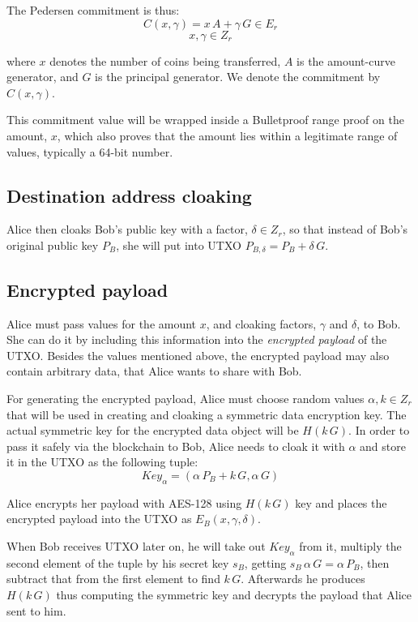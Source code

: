 \documentclass[8pt,fleqn,openany]{book}
\begin{document}
The Pedersen commitment is thus:
$$ C(x, \gamma) = x \, A + \gamma \, G \in E_r$$
$$x, \gamma \in Z_r$$

where $x$ denotes the number of coins being transferred, $A$ is the amount-curve generator, and $G$ is the principal generator. We denote the commitment by $C(x, \gamma)$. 

This commitment value will be wrapped inside a Bulletproof range proof on the amount, $x$, which also proves that the amount lies within a legitimate range of values, typically a 64-bit number.

\subsection{Destination address cloaking} Alice then cloaks Bob’s public key with a factor, $\delta \in Z_r$, so that instead of Bob’s original public key $P_B$, she will put into UTXO $P_{B, \delta} = P_B + \delta \, G$.

\subsection{Encrypted payload} Alice must pass values for the amount $x$, and cloaking factors, $\gamma$ and $\delta$, to Bob. She can do it by including this information into the \textit{encrypted payload} of the UTXO. Besides the values mentioned above, the encrypted payload may also contain arbitrary data, that Alice wants to share with Bob. 

For generating the encrypted payload, Alice must choose random values $\alpha, k \in Z_r$ that will be used in creating and cloaking a symmetric data encryption key.
The actual symmetric key for the encrypted data object will be $H(k \, G)$. In order to pass it safely via the blockchain to Bob, Alice needs to cloak it with $\alpha$ and store it in the UTXO as the following tuple: $$\mathit{Key}_{\alpha} = (\alpha \, P_{B} + k \, G, \alpha \, G )$$ 

Alice encrypts her payload with AES-128 using $H(k \, G)$ key and places the encrypted payload into the UTXO as $E_B(x, \gamma, \delta)$.

When Bob receives UTXO later on, he will take out $\mathit{Key}_{\alpha}$ from it, multiply the second element of the tuple by his secret key $s_B$, getting $s_B \, \alpha \, G = \alpha \, P_B$, then subtract that from the first element to find $k \, G$. Afterwards he produces $H(k \, G)$ thus computing the symmetric key and decrypts the payload that Alice sent to him.
\end{document}

